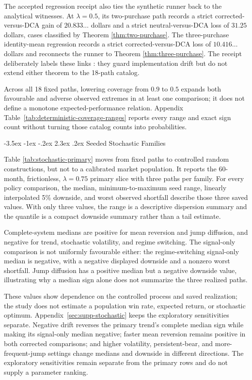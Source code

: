 \documentclass[12pt,a4paper,oneside]{report}
\makeatletter
\renewcommand\section{\@startsection{section}{1}{\z@}%
  {-3.5ex \@plus -1ex \@minus -.2ex}%
  {2.3ex \@plus .2ex}%
  {\normalfont\fontsize{14}{17}\selectfont\bfseries}}
\makeatother
\begin{document}
The accepted regression receipt also ties the synthetic runner back to the
analytical witnesses. At $\lambda=0.5$, its two-purchase path records a strict
corrected-versus-DCA gain of $20.833\ldots$ dollars and a strict
neutral-versus-DCA loss of $31.25$ dollars, cases classified by Theorem
\ref{thm:two-purchase}. The three-purchase identity-mean regression records a
strict corrected-versus-DCA loss of $10.416\ldots$ dollars and reconnects the
runner to Theorem \ref{thm:three-purchase}. The receipt deliberately labels
these links : they guard implementation
drift but do not extend either theorem to the 18-path catalog.

Across all 18 fixed paths, lowering coverage from $0.9$ to $0.5$ expands both
favourable and adverse observed extremes in at least one comparison; it does
not define a monotone expected-performance relation.
Appendix Table~\ref{tab:deterministic-coverage-ranges}
reports every range and exact sign count without turning those catalog counts
into probabilities.

\section{Seeded Stochastic Families}
\label{sec:stochastic}

Table \ref{tab:stochastic-primary} moves from fixed paths to controlled random
constructions, but not to a calibrated market population. It reports the
60-month, frictionless, $\lambda=0.75$ primary slice with three paths per
family. For every policy comparison, the median, minimum-to-maximum seed
range, linearly interpolated 5\% downside, and worst observed shortfall
describe those three saved values. With only three values, the range is a
descriptive dispersion summary and the quantile is a compact downside summary
rather than a tail estimate.



Complete-system medians are positive for mean reversion and jump diffusion,
and negative for trend, stochastic volatility, and regime switching. The
signal-only comparison is not uniformly favourable either: the
regime-switching signal-only median is negative, with a negative displayed
downside and a nonzero worst shortfall. Jump diffusion has a positive median
but a negative downside value, illustrating why a median sign alone does not
summarize the three realized paths.

These values show dependence on the controlled process and saved realization;
the study does not estimate a population win rate, expected return, or
stochastic optimum. Appendix~\ref{sec:supp-stochastic} keeps the exploratory
sensitivities separate. Negative drift reverses the primary trend's complete
median sign while making its signal-only median negative; faster mean
reversion remains positive in both corrected comparisons; and higher
volatility, persistent-bear, and more-frequent-jump settings change medians and
downside in different directions. The exploratory sensitivities remain
separate from the primary rows and do not supply a parameter ranking.
\end{document}
